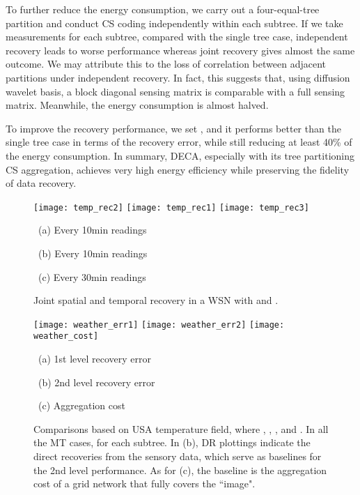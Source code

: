 \documentclass[conference]{IEEEtran}
\begin{document}
    To further reduce the energy consumption, we carry out a four-equal-tree partition and conduct CS coding independently within each subtree. If we take  measurements for each subtree, compared with the single tree case, independent recovery leads to worse performance whereas joint recovery gives almost the same outcome. We may attribute this to the loss of correlation between adjacent partitions under independent recovery. In fact, this suggests that, using diffusion wavelet basis, a block diagonal sensing matrix is comparable with a full sensing matrix. Meanwhile, the energy consumption is almost halved.

    To improve the recovery performance, we set , and it performs better than the single tree case in terms of the recovery error, while still reducing at least 40\% of the energy consumption. In summary, DECA, especially with its tree partitioning CS aggregation, achieves very high energy efficiency while preserving the fidelity of data recovery.

    \begin{figure*}[t]
      \begin{minipage}{\textwidth}
      \begin{center}
        \texttt{[image: temp\_rec2]}
        \texttt{[image: temp\_rec1]}
        \texttt{[image: temp\_rec3]}
        \parbox{.329\textwidth}{\center\scriptsize~(a) Every 10min readings}
        \parbox{.327\textwidth}{\center\scriptsize~(b) Every 10min readings}
        \parbox{.329\textwidth}{\center\scriptsize~(c) Every 30min readings}
\caption{Joint spatial and temporal recovery in a WSN with  and .}
        \label{fig:temprec}
      \end{center}
      \end{minipage}
      \begin{minipage}{\textwidth}
      \begin{center}
        \texttt{[image: weather\_err1]}
	    \texttt{[image: weather\_err2]}
        \texttt{[image: weather\_cost]}
        \parbox{.33\textwidth}{\center\scriptsize~(a) 1st level recovery error}
        \parbox{.33\textwidth}{\center\scriptsize~(b) 2nd level recovery error}
        \parbox{.327\textwidth}{\center\scriptsize~(c) Aggregation cost}
\caption{Comparisons based on USA temperature field, where , , , and . In all the MT cases,  for each subtree. In (b), DR plottings indicate the direct recoveries from the sensory data, which serve as baselines for the 2nd level performance. As for (c), the baseline is the aggregation cost of a  grid network that fully covers the ``image".}
        \label{fig:weathercomp}
      \end{center}
      \end{minipage}
\end{figure*}
\end{document}

